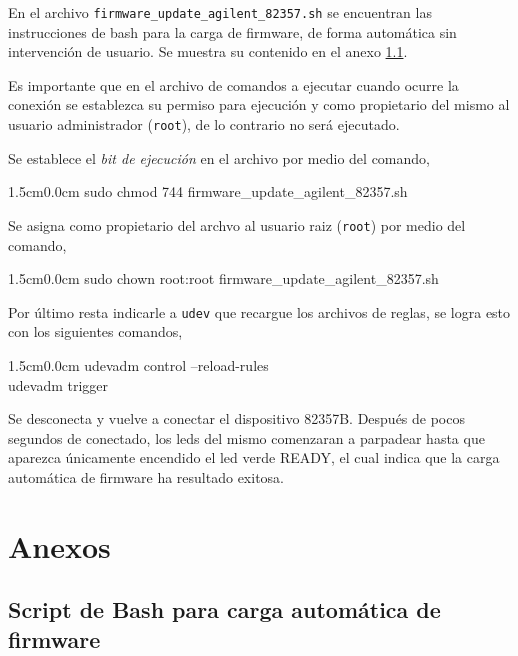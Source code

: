 \documentclass[paper=letter,oneside,fontsize=11pt, parskip=full]{scrartcl}
\newenvironment{code}
	{\begin{adjustwidth}{1.5cm}{0.0cm}\ttfamily}
	{\end{adjustwidth}}
\begin{document}
	En el archivo \texttt{firmware\_update\_agilent\_82357.sh} se encuentran las instrucciones de bash para la carga de firmware, de forma automática sin intervención de usuario. Se muestra su contenido en el anexo \ref{Sec:FirmwareUploadScript}.
	
	Es importante que en el archivo de comandos a ejecutar cuando ocurre la conexión se establezca su permiso para ejecución y como propietario del mismo al usuario administrador (\texttt{root}), de lo contrario no será ejecutado. 
	
	Se establece el \emph{bit de ejecución} en el archivo por medio del comando, 
	
	\begin{code}
		sudo chmod 744 firmware\_update\_agilent\_82357.sh
	\end{code}

	Se asigna como propietario del archvo al usuario raiz (\texttt{root}) por medio del comando,
	
	\begin{code}
		sudo chown root:root firmware\_update\_agilent\_82357.sh
	\end{code}

	Por último resta indicarle a \texttt{udev} que recargue los archivos de reglas, se logra esto con los siguientes comandos, 
	
	\begin{code}
		udevadm control --reload-rules \\
		udevadm trigger
	\end{code}

	Se desconecta y vuelve a conectar el dispositivo 82357B. Después de pocos segundos de conectado, los leds del mismo comenzaran a parpadear hasta que aparezca únicamente encendido el led verde READY, el cual indica que la carga automática de firmware ha resultado exitosa.
	
	\newpage
			
	\section{Anexos}	
		
	\subsection{Script de Bash para carga automática de firmware}
	\label{Sec:FirmwareUploadScript}
	
\end{document}

